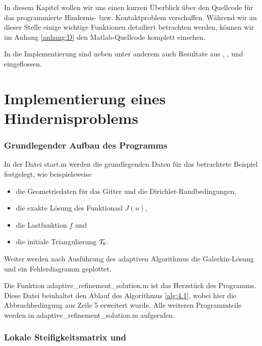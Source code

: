 \label{kap:5}

In diesem Kapitel wollen wir uns einen kurzen Überblick über den Quellcode für das programmierte Hindernis- bzw. Kontaktproblem verschaffen. Während wir an dieser Stelle einige wichtige Funktionen detailiert betrachten werden, können wir im Anhang \ref{anhang:D} den Matlab-Quellcode komplett einsehen.

In die Implementierung sind neben \cite{ZouVee} unter anderem auch Resultate aus \cite{MorNoc}, \cite{BarCar}, \cite{BraeFEM} und \cite{EPS} eingeflossen.


\section{Implementierung eines Hindernisproblems}
\label{kap:5.1}


\subsubsection{Grundlegender Aufbau des Programms}

In der Datei {\ttfamily start.m} werden die grundlegenden Daten für das betrachtete Beispiel festgelegt, wie beispielsweise
\begin{itemize}
\item die Geometriedaten für das Gitter und die Dirichlet-Randbedingungen,
\item die exakte Lösung des Funktionasl $J(u)$,
\item die Lastfunktion $f$ und
\item die initiale Triangulierung $\mathcal T_0$.
\end{itemize}
Weiter werden nach Ausführung des adaptiven Algorithmus die Galerkin-Lösung und ein Fehlerdiagramm geplottet. 

Die Funktion {\ttfamily adaptive_refinement_solution.m} ist das Herzstück des Programms. Diese Datei beinhaltet den Ablauf des Algorithmus \ref{alg:4.1}, wobei hier die Abbruchbedingung aus Zeile 5 erweitert wurde. Alle weiteren Programmteile werden in {\ttfamily adaptive_refinement_solution.m} aufgerufen.


\subsubsection{Lokale Steifigkeitsmatrix und }

